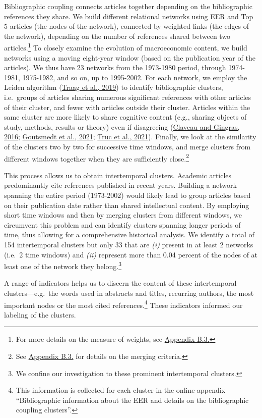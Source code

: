 \documentclass[
  12pt,
  onecolumn]{article}
\begin{document}
Bibliographic coupling connects articles together depending on the
bibliographic references they share. We build different relational
networks using EER and Top 5 articles (the nodes of the network),
connected by weighted links (the edges of the network), depending on the
number of references shared between two articles.\footnote{For more
  details on the measure of weights, see
  \protect\hyperlink{network}{Appendix B.3.}} To closely examine the
evolution of macroeconomic content, we build networks using a moving
eight-year window (based on the publication year of the articles). We
thus have 23 networks from the 1973-1980 period, through 1974-1981,
1975-1982, and so on, up to 1995-2002. For each network, we employ the
Leiden algorithm (\protect\hyperlink{ref-traag2019}{Traag et al., 2019})
to identify bibliographic clusters, i.e.~groups of articles sharing
numerous significant references with other articles of their cluster,
and fewer with articles outside their cluster. Articles within the same
cluster are more likely to share cognitive content (e.g., sharing
objects of study, methods, results or theory) even if disagreeing
(\protect\hyperlink{ref-claveau2016}{Claveau and Gingras, 2016};
\protect\hyperlink{ref-goutsmedt2021}{Goutsmedt et al., 2021};
\protect\hyperlink{ref-truc2021}{Truc et al., 2021}). Finally, we look
at the similarity of the clusters two by two for successive time
windows, and merge clusters from different windows together when they
are sufficiently close.\footnote{See
  \protect\hyperlink{network}{Appendix B.3.} for details on the merging
  criteria.}

This process allows us to obtain intertemporal clusters. Academic
articles predominantly cite references published in recent years.
Building a network spanning the entire period (1973-2002) would likely
lead to group articles based on their publication date rather than
shared intellectual content. By employing short time windows and then by
merging clusters from different windows, we circumvent this problem and
can identify clusters spanning longer periods of time, thus allowing for
a comprehensive historical analysis. We identify a total of 154
intertemporal clusters but only 33 that are \emph{(i)} present in at
least 2 networks (i.e.~2 time windows) and \emph{(ii)} represent more
than 0.04 percent of the nodes of at least one of the network they
belong.\footnote{We confine our investigation to these prominent
  intertemporal clusters.}

A range of indicators helps us to discern the content of these
intertemporal clusters---e.g.~the words used in abstracts and titles,
recurring authors, the most important nodes or the most cited
references.\footnote{This information is collected for each cluster in
  the online appendix ``Bibliographic information about the EER and
  details on the bibliographic coupling clusters''.} These indicators
informed our labeling of the clusters.
\end{document}
